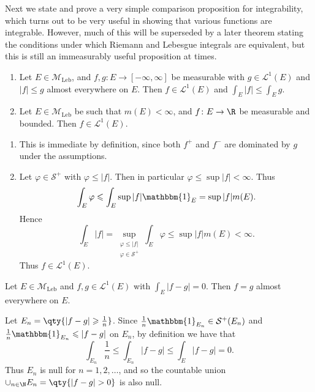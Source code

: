 \documentclass{maths}
\newcommand{\mleb}{\mathcal{M}_{\text{Leb}}}
\newcommand{\smpl}{\mathcal{S}}
\newcommand{\ind}{\mathbbm{1}}
\begin{document}
Next we state and prove a very simple comparison proposition for integrability, which turns out to be very useful in showing that various functions are integrable.
However, much of this will be superseded by a later theorem stating the conditions under which Riemann and Lebesgue integrals are equivalent, but this is still an immeasurably useful proposition at times.

\begin{prop}
    \begin{enumerate}
        \item Let $E\in\mleb$, and $f,g\colon E\to[-\infty,\infty]$ be measurable with $g\in \mathcal{L}^1(E)$ and $|f|\leqslant g$ almost everywhere on $E$.
        Then $f\in \mathcal{L}^1(E)$ and $\int_E |f| \leqslant \int_E g$.
        \item Let $E\in\mleb$ be such that $m(E)<\infty$, and $f\colon E\to\R$ be measurable and bounded.
        Then $f\in \mathcal{L}^1(E)$.
    \end{enumerate}
\end{prop}

\begin{prf}
    \begin{enumerate}
        \item This is immediate by definition, since both $f^+$ and $f^-$ are dominated by $g$ under the assumptions.
        \item Let $\varphi\in\smpl^+$ with $\varphi\leqslant|f|$.
        Then in particular $\varphi\leqslant\sup|f|<\infty$.
        Thus
        \[
            \int_E \varphi \leqslant
            \int_E \sup |f|\ind_E =
            \sup |f| m(E).
        \]
        Hence
        \[
            \int_E |f| =
            \sup_{\substack{\varphi\leqslant|f|\\\varphi\in\smpl^+}} \int_E \varphi \leqslant
            \sup |f| m(E) <
            \infty.
        \]
        Thus $f\in \mathcal{L}^1(E)$.
    \end{enumerate}
\end{prf}

\begin{prop}
    Let $E\in\mleb$ and $f,g\in \mathcal{L}^1(E)$ with $\int_E |f-g| =0$.
    Then $f=g$ almost everywhere on $E$.
\end{prop}

\begin{prf}
    Let $E_n = \qty{|f-g| \geqslant \frac{1}{n}}$.
    Since $\frac{1}{n}\ind_{E_n}\in\smpl^+(E_n)$ and $\frac{1}{n}\ind_{E_n}\leqslant|f-g|$ on $E_n$, by definition we have that
    \[
        \int_{E_n} \frac{1}{n} \leqslant
        \int_{E_n} |f-g| \leqslant
        \int_E |f-g| =
        0.
    \]
    Thus $E_n$ is null for $n=1,2,\ldots$, and so the countable union $\cup_{n\in\N} E_n = \qty{|f-g|>0}$ is also null.
\end{prf}
\end{document}
